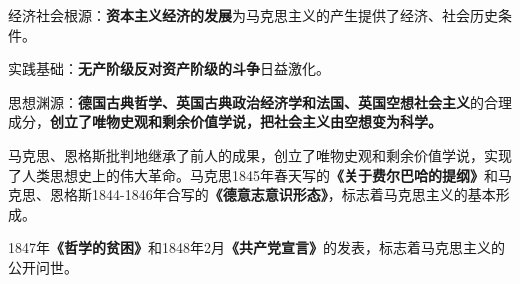 {经济社会根源}：\textbf{{资本主义经济的发展}}为马克思主义的产生提供了经济、社会历史条件。

{{实践基础：}\textbf{{无产阶级反对资产阶级的斗争}}日益激化。}

{{思想渊源：}\textbf{{德国古典哲学、英国古典政治经济学和法国、英国空想社会主义}}的合理成分，\textbf{{创立了唯物史观和剩余价值学说，把社会主义由空想变为科学。}}}

{马克思、恩格斯批判地继承了前人的成果，创立了唯物史观和剩余价值学说，实现了人类思想史上的伟大革命。马克思}{1845}{年春天写的\textbf{{《关于费尔巴哈的提纲》}}和马克思、恩格斯}{1844-1846}{年合写的\textbf{{《德意志意识形态》}}，{标志着马克思主义的基本形成}。}

{1847}{年\textbf{{《哲学的贫困》}}和}{1848}{年}{2}{月\textbf{{《共产党宣言》}}的发表，{标志着马克思主义的公开问世}。}
